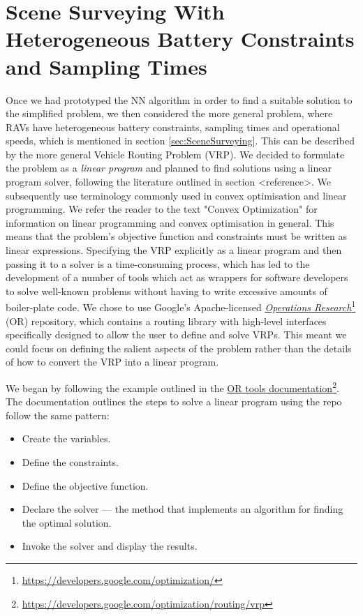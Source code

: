 \section{Scene Surveying With Heterogeneous Battery Constraints and Sampling Times}\label{sec:SceneSurveyingBatteryConstraints}

Once we had prototyped the NN algorithm in order to find a suitable solution to the simplified problem, we then considered the more general problem, where RAVs have heterogeneous battery constraints, sampling times and operational speeds, which is mentioned in section \ref{sec:SceneSurveying}. This can be described by the more general Vehicle Routing Problem (VRP). We decided to formulate the problem as a \textit{linear program} and planned to find solutions using a linear program solver, following the literature outlined in section <reference>. We subsequently use terminology commonly used in convex optimisation and linear programming. We refer the reader to the text "Convex Optimization" \cite{Boyd2004ConvexOptimization} for information on linear programming and convex optimisation in general. This means that the problem's objective function and constraints must be written as linear expressions.
Specifying the VRP explicitly as a linear program and then passing it to a solver is a time-consuming process, which has led to the development of a number of tools which act as wrappers for software developers to solve well-known problems without having to write excessive amounts of boiler-plate code. We chose to use Google's Apache-licensed \href{https://developers.google.com/optimization/}{\textit{Operations Research}}\footnote{\href {https://developers.google.com/optimization/}{https://developers.google.com/optimization/}} (OR) repository, which contains a routing library with high-level interfaces specifically designed to allow the user to define and solve VRPs. This meant we could focus on defining the salient aspects of the problem rather than the details of how to convert the VRP into a linear program.

We began by following the example outlined in the \href{https://developers.google.com/optimization/routing/vrp}{OR tools documentation}\footnote{\href {https://developers.google.com/optimization/routing/vrp}{https://developers.google.com/optimization/routing/vrp}}. The documentation outlines the steps to solve a linear program using the repo follow the same pattern: 
\begin{itemize}
\item Create the variables.
\item Define the constraints.
\item Define the objective function.
\item Declare the solver — the method that implements an algorithm for finding the optimal solution.
\item Invoke the solver and display the results.
\end{itemize}

